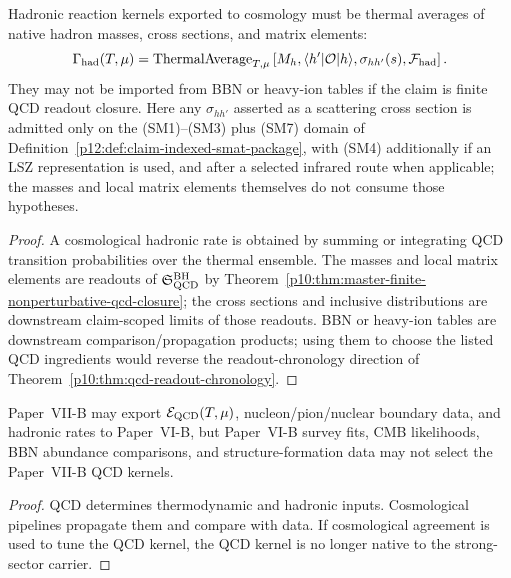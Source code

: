 \documentclass[12pt,a4paper]{article}
\begin{document}
\begin{proposition}
\label{p11:prop:hadronic-rates-native-thermal-averages}
Hadronic reaction kernels exported to cosmology must be thermal averages of native hadron masses, cross sections, and matrix elements:
\begin{equation}
\label{p11:eq:hadronic-rate-native-average}
\Gamma_{\rm had}(T,\mu)
=
\operatorname{ThermalAverage}_{T,\mu}
\left[M_h,\langle h'|\mathcal O|h\rangle,\sigma_{hh'}(s),\mathcal F_{\rm had}\right].
\end{equation}
They may not be imported from BBN or heavy-ion tables if the claim is finite QCD readout closure.
Here any \(\sigma_{hh'}\) asserted as a scattering cross section is admitted
only on the \textnormal{(SM1)--(SM3)} plus \textnormal{(SM7)} domain of
Definition~\ref{p12:def:claim-indexed-smat-package}, with
\textnormal{(SM4)} additionally if an LSZ representation is used, and after a
selected infrared route when applicable; the masses and local matrix elements
themselves do not consume those hypotheses.
\end{proposition}
\begin{proof}
A cosmological hadronic rate is obtained by summing or integrating QCD
transition probabilities over the thermal ensemble.  The masses and local
matrix elements are readouts of \(\mathfrak S_{\rm QCD}^{\rm BH}\) by
Theorem~\ref{p10:thm:master-finite-nonperturbative-qcd-closure}; the cross
sections and inclusive distributions are downstream claim-scoped limits of
those readouts.  BBN or heavy-ion tables are downstream
comparison/propagation products; using them to choose the listed QCD ingredients
would reverse the readout-chronology direction of Theorem~\ref{p10:thm:qcd-readout-chronology}.
\end{proof}

\begin{theorem}
\label{p11:thm:cosmological-export-boundary}
Paper~VII-B may export \(\mathcal E_{\rm QCD}(T,\mu)\), nucleon/pion/nuclear boundary data, and hadronic rates to Paper~VI-B, but Paper~VI-B survey fits, CMB likelihoods, BBN abundance comparisons, and structure-formation data may not select the Paper~VII-B QCD kernels.
\end{theorem}
\begin{proof}
QCD determines thermodynamic and hadronic inputs.  Cosmological pipelines propagate them and compare with data.  If cosmological agreement is used to tune the QCD kernel, the QCD kernel is no longer native to the strong-sector carrier.\qedhere
\end{proof}
\end{document}
